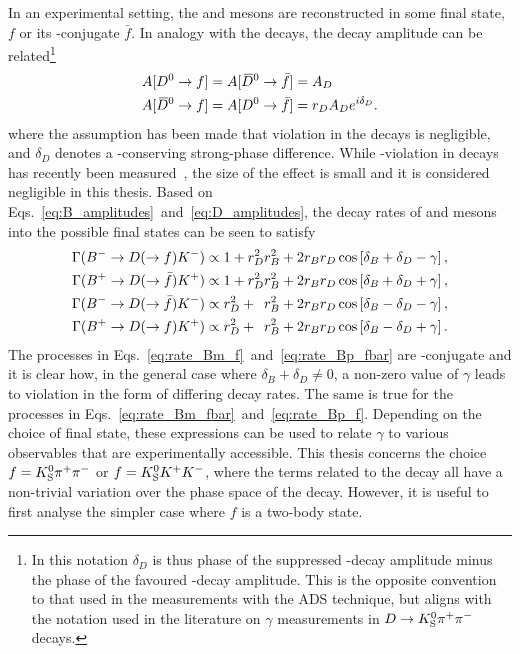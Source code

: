 In an experimental setting, the \Dz and \Dzb mesons are reconstructed in some final state, $f$ or its \CP-conjugate $\bar f$. In analogy with the \Bpm decays, the \D decay amplitude can be related\footnote{In this notation $\delta_D$ is thus phase of the suppressed \D-decay amplitude minus the phase of the favoured \D-decay amplitude. This is the opposite convention to that used in the \lhcb measurements with the ADS technique, but aligns with the notation used in the literature on $\gamma$ measurements in ${D}\rightarrow{\ensuremath{{K}^0_{\mathrm{S}}}}{\ensuremath{{\pi}^+}}{\ensuremath{{\pi}^-}}$ decays.} 
\begin{align}
\begin{split}\label{eq:D_amplitudes}
    A[{{D}^0}\rightarrow f] &= A[{{\kern 0.18em\overline{\kern -0.18em D}}{}^0}\rightarrow \bar f] = A_D \\ 
    A[{{\kern 0.18em\overline{\kern -0.18em D}}{}^0} \rightarrow f] &= A[{{D}^0} \rightarrow \bar f] = r_D A_D e^{i\delta_D}.
\end{split}
\end{align}
where the assumption has been made that \CP violation in the \D decays is negligible, and $\delta_D$ denotes a \CP-conserving strong-phase difference. While \CP-violation in \D decays has recently been measured~\cite{LHCb-PAPER-2019-006}, the size of the effect is small and it is considered negligible in this thesis. Based on Eqs.~\ref{eq:B_amplitudes}~and~\eqref{eq:D_amplitudes}, the decay rates of \Bp and \Bm mesons into the possible final states can be seen to satisfy 
\begin{subequations}\label{eq:rate_equations}
\begin{align}
    \Gamma({{{B}^-}} \rightarrow {\ensuremath{D}}(\rightarrow f){{K}^-}) & \propto 
    1 + r_D^2 r_B^2 + 2 r_B r_D \cos\left[\delta_B + \delta_D - \gamma\right], \label{eq:rate_Bm_f}\\
    \Gamma({{{B}^+}} \rightarrow {\ensuremath{D}}(\rightarrow \bar f){{K}^+}) & \propto 
    1 + r_D^2 r_B^2 + 2 r_B r_D \cos\left[\delta_B + \delta_D + \gamma\right], \label{eq:rate_Bp_fbar}\\
    \Gamma({{{B}^-}} \rightarrow {\ensuremath{D}}(\rightarrow \bar f){{K}^-}) & \propto
    r_D^2 + \phantom{1}r_B^2 + 2 r_B r_D \cos\left[\delta_B - \delta_D - \gamma\right], \label{eq:rate_Bm_fbar}\\
    \Gamma({{{B}^+}} \rightarrow {\ensuremath{D}}(\rightarrow f){{K}^+}) & \propto
    r_D^2 + \phantom{1}r_B^2 + 2 r_B r_D \cos\left[\delta_B - \delta_D + \gamma\right]. \label{eq:rate_Bp_f} 
\end{align}
\end{subequations}
The processes in Eqs.~\eqref{eq:rate_Bm_f}~and~\eqref{eq:rate_Bp_fbar} are \CP-conjugate and it is clear how, in the general case where $\delta_B+\delta_D\neq 0$,  a non-zero value of $\gamma$ leads to \CP violation in the form of differing decay rates. The same is true for the processes in Eqs.~\eqref{eq:rate_Bm_fbar}~and~\eqref{eq:rate_Bp_f}. Depending on the choice of \D final state, these expressions can be used to relate $\gamma$ to various observables that are experimentally accessible. This thesis concerns the choice $f={{K}^0_{\mathrm{S}}}{{\pi}^+}{{\pi}^-}$ or $f={{K}^0_{\mathrm{S}}}{{K}^+}{{K}^-}$, where the terms related to the \D decay all have a non-trivial variation over the phase space of the decay. However, it is useful to first analyse the simpler case where $f$ is a two-body state. 


